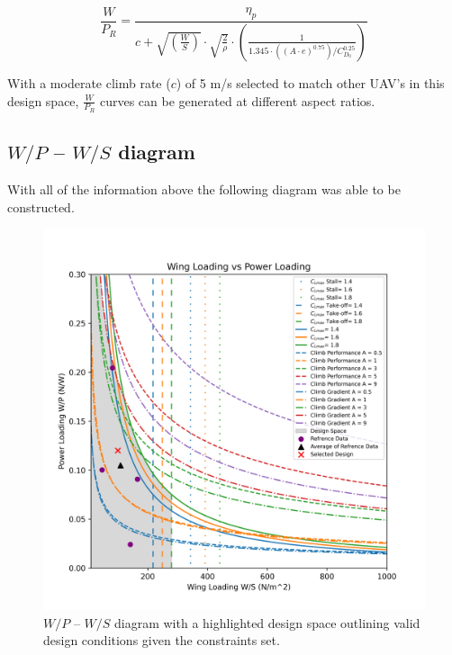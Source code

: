 \documentclass[12pt]{article}
\begin{document}
	\begin{equation}
		\frac{W}{P_R} = \frac{\eta_p}{c + \sqrt{\left(\frac{W}{S}\right)} \cdot \sqrt{\frac{2}{\rho}} \cdot \left( \frac{1}{1.345 \cdot \left( (A \cdot e)^{0.75} \right) / C_{D_0}^{0.25}} \right)}
	\end{equation}
	
	With a moderate climb rate ($c$) of 5 m/s selected to match other UAV's in this design space, $	\frac{W}{P_R}$ curves can be generated at different aspect ratios. 

	\subsection{$W/P$ – $W/S$ diagram}
	
	With all of the information above the following diagram was able to be constructed. 
	
	\begin{figure}[h!]
		\centering
		\includegraphics[width=7in]{Figures/Wing_Loading_vs_Power_Loading.png} %
		\caption{$W/P$ – $W/S$ diagram with a highlighted design space outlining valid design conditions given the constraints set.}
		\label{fig:WPWSDiagram}
	\end{figure}
	
\end{document}
